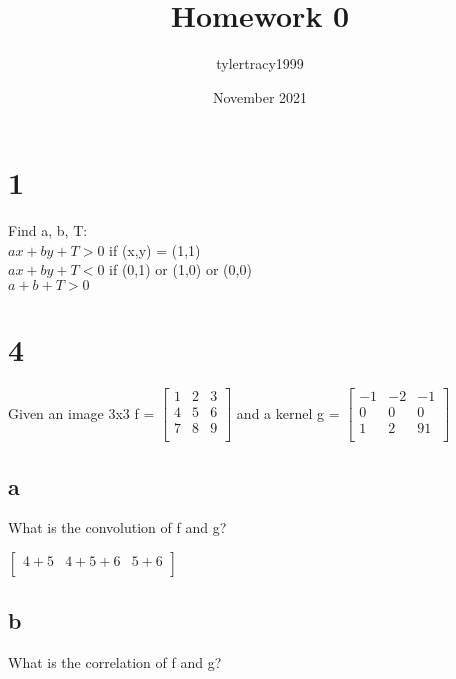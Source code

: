 \documentclass{article}
\title{Homework 0}
\author{tylertracy1999 }
\date{November 2021}
\begin{document}
\maketitle


\section*{1}

Find a, b, T: \\
$ax + by  + T > 0$ if (x,y) = (1,1) \\
$ax + by + T < 0$ if (0,1) or (1,0) or (0,0) \\

$a + b + T > 0$




\section*{4}


Given an image 3x3 f = $\begin{bmatrix}
	1 & 2 & 3\\
	4 & 5 & 6 \\
	7 & 8 & 9 \\
\end{bmatrix}$
and a kernel g = $\begin{bmatrix}
	-1 & -2 & -1 \\
	0 & 0 & 0 \\
	1 & 2 & 91 \\
\end{bmatrix}$

\subsection*{a}
What is the convolution of f and g?

$\begin{bmatrix}
	4 + 5 & 4 + 5 + 6 & 5 + 6 \\
\end{bmatrix}$


\subsection*{b}
What is the correlation of f and g?
\end{document}
